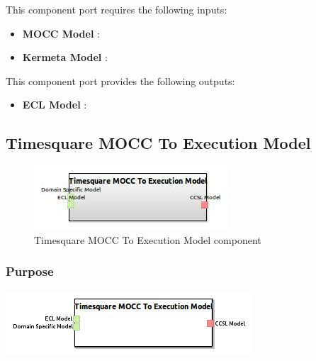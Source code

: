 \documentclass{gemoc} %
\begin{document}
This component port requires the following inputs:
\begin{itemize}
  \item \textbf{MOCC Model} :
  \item \textbf{Kermeta Model} :
\end{itemize}

This component port provides the following outputs:
\begin{itemize}
  \item \textbf{ECL Model} :
\end{itemize}

\subsection{Timesquare MOCC To Execution Model}

\begin{figure}[htp]
	\begin{center}
	\includegraphics*[trim=0.0cm 0.0cm 0cm 0.0cm, clip=true, scale=1.0]{../images/generated/Generated_Timesquare MOCC To Execution Model.jpg}
	\caption{Timesquare MOCC To Execution Model component}
	\end{center}
\end{figure}

\subsubsection{Purpose}

\begin{center}
\includegraphics*[trim=0.0cm 0.0cm 0cm 0.0cm, clip=true]{../images/generated/Generated_Timesquare_MOCC_To_Execution_Model.png}
\end{center}
\end{document}
